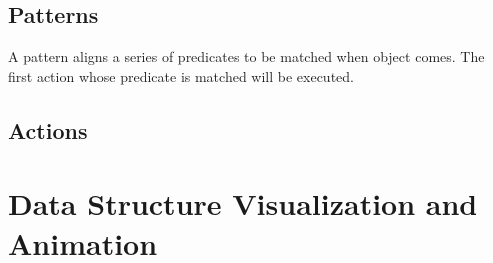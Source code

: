 \subsection {Patterns}
A pattern aligns a series of predicates to be matched when object comes. The first action whose predicate is matched will be executed.

\subsection {Actions}

\section {Data Structure Visualization and Animation}
